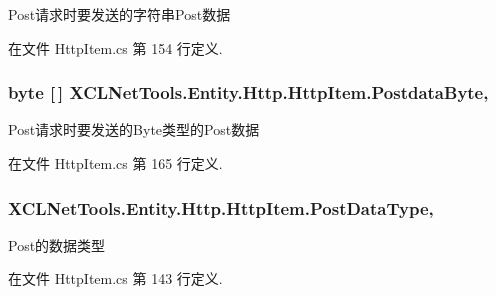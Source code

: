 Post请求时要发送的字符串\-Post数据 



在文件 Http\-Item.\-cs 第 154 行定义.

\hypertarget{class_x_c_l_net_tools_1_1_entity_1_1_http_1_1_http_item_a49b2ba8771878dab0de105397ebc69de}{
\subsubsection[{Postdata\-Byte}]{\setlength{\rightskip}{0pt plus 5cm}byte \mbox{[}$\,$\mbox{]} X\-C\-L\-Net\-Tools.\-Entity.\-Http.\-Http\-Item.\-Postdata\-Byte\hspace{0.3cm}{\ttfamily [get]}, {\ttfamily [set]}}}\label{class_x_c_l_net_tools_1_1_entity_1_1_http_1_1_http_item_a49b2ba8771878dab0de105397ebc69de}


Post请求时要发送的\-Byte类型的\-Post数据 



在文件 Http\-Item.\-cs 第 165 行定义.

\hypertarget{class_x_c_l_net_tools_1_1_entity_1_1_http_1_1_http_item_a4b06cbf69ce5d07151aa768f00bccdf2}{
\subsubsection[{Post\-Data\-Type}]{ X\-C\-L\-Net\-Tools.\-Entity.\-Http.\-Http\-Item.\-Post\-Data\-Type\hspace{0.3cm}{\ttfamily [get]}, {\ttfamily [set]}}}\label{class_x_c_l_net_tools_1_1_entity_1_1_http_1_1_http_item_a4b06cbf69ce5d07151aa768f00bccdf2}


Post的数据类型 



在文件 Http\-Item.\-cs 第 143 行定义.

